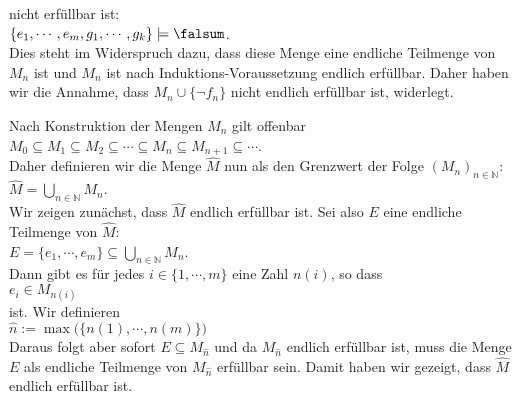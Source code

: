 \begin{enumerate}
\begin{enumerate}
        nicht erf\"{u}llbar ist:
        \\[0.2cm]
        \hspace*{1.3cm}
        $\{ e_1, \cdots, e_m, g_1, \cdots, g_k \} \models \falsum$.
        \\[0.2cm]
        Dies steht im Widerspruch dazu, dass diese Menge eine endliche Teilmenge von $M_n$ ist und
        $M_n$ ist nach Induktions-Voraussetzung endlich erf\"{u}llbar.  Daher haben wir die Annahme,
        dass $M_n \cup \{ \neg f_n \}$ nicht endlich erf\"{u}llbar ist, widerlegt. 
  \end{enumerate}
  Nach Konstruktion der Mengen $M_n$ gilt offenbar
  \\[0.2cm]
  \hspace*{1.3cm}
  $M_0 \subseteq M_1 \subseteq M_2 \subseteq \cdots \subseteq M_n \subseteq M_{n+1} \subseteq \cdots$.
  \\[0.2cm]
  Daher definieren wir die Menge $\widehat{M}$ nun als den Grenzwert der Folge $(M_n)_{n \in \mathbb{N}}$:
  \\[0.2cm]
  \hspace*{1.3cm}
  $\widehat{M} = \bigcup\limits_{n \in \mathbb{N}} M_n$.
  \\[0.2cm]
  Wir zeigen zun\"{a}chst, dass $\widehat{M}$ endlich erf\"{u}llbar ist.  Sei also $E$ eine endliche
  Teilmenge von $\widehat{M}$:
  \\[0.2cm]
  \hspace*{1.3cm}
  $E = \{ e_1, \cdots, e_m \} \subseteq \bigcup\limits_{n \in \mathbb{N}} M_n$.
  \\[0.2cm]
  Dann gibt es f\"{u}r jedes $i \in \{ 1, \cdots, m \}$ eine Zahl $n(i)$, so dass
  \\[0.2cm]
  \hspace*{1.3cm}
  $e_i \in M_{n(i)}$ 
  \\[0.2cm]
  ist.  Wir definieren
  \\[0.2cm]
  \hspace*{1.3cm}
  $\widehat{n} := \max\bigl(\bigl\{n(1), \cdots, n(m) \bigr\}\bigr)$
  \\[0.2cm]
  Daraus folgt aber sofort $E \subseteq M_{\widehat{n}}$ und da $M_{\widehat{n}}$ endlich erf\"{u}llbar
  ist, muss die Menge $E$ als endliche Teilmenge von $M_{\widehat{n}}$ erf\"{u}llbar sein.
  Damit haben wir gezeigt, dass $\widehat{M}$ endlich erf\"{u}llbar ist.


\end{enumerate}
